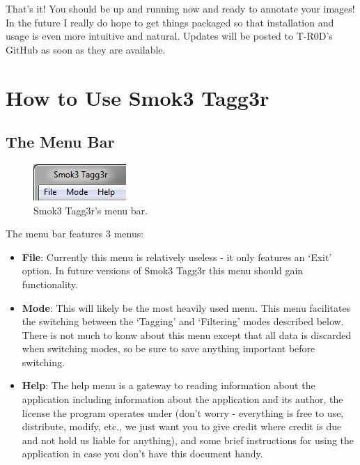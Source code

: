 \documentclass{article}
\begin{document}
That's it! You should be up and running now and ready to annotate your images!\\

In the future I really do hope to get things packaged so that installation and usage is even more intuitive and natural. Updates will be posted to T-R0D's GitHub as soon as they are available.

\section{How to Use Smok3 Tagg3r}
\subsection{The Menu Bar}
  \begin{figure}[h!]
    \centering
    \includegraphics[width=.3\linewidth]{menu_bar}
    \caption{Smok3 Tagg3r's menu bar.}
    \label{fig:menu_bar}
  \end{figure}

The menu bar features $3$ menus:
\begin{itemize}
  \item \textbf{File}: Currently this menu is relatively useless - it only features an `Exit' option. In future versions of Smok3 Tagg3r this menu should gain functionality.

  \item \textbf{Mode}: This will likely be the most heavily used menu. This menu facilitates the switching between the `Tagging' and `Filtering' modes described below. There is not much to konw about this menu except that all data is discarded when switching modes, so be sure to save anything important before switching.

  \item \textbf{Help}: The help menu is a gateway to reading information about the application including information about the application and its author, the license the program operates under (don't worry - everything is free to use, distribute, modify, etc., we just want you to give credit where credit is due and not hold us liable for anything), and some brief instructions for using the application in case you don't have this document handy.
\end{itemize}
\end{document}
